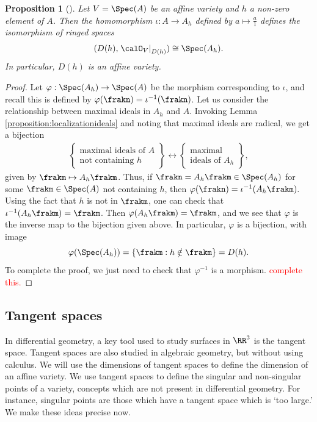 \documentclass[12pt]{amsart}
\theoremstyle{plain}
\newtheorem{proposition}[theorem]{Proposition}
\theoremstyle{definition}
\begin{document}
\begin{proposition}[{\cite[Proposition 3.32]{Milne13}}]\label{proposition:localisationembedding}
Let $V = \Spec(A)$ be an affine variety and $h$ a non-zero element of $A$.
Then the homomorphism $\iota : A \to A_h$ defined by $a \mapsto \frac{a}{1}$ defines the isomorphism of ringed spaces
$$(D(h), \left. \calO_V \right|_{D(h)}) \cong \Spec(A_h).$$
In particular, $D(h)$ is an affine variety.
\end{proposition}
\begin{proof}
Let $\varphi : \Spec(A_h) \to \Spec(A)$ be the morphism corresponding to $\iota$, and recall this is defined by $\varphi(\frakn) = \iota^{-1}(\frakn)$.
Let us consider the relationship between maximal ideals in $A_h$ and $A$.
Invoking Lemma \ref{proposition:localizationideals} and noting that maximal ideals are radical, we get a bijection
\begin{align*}
\left\{
\begin{array}{c}
	\text{maximal ideals of } A \\
	\text{not containing } h
\end{array}
\right\} \longleftrightarrow 
\left\{
\begin{array}{c}
	\text{maximal} \\
	\text{ideals of } A_h 
\end{array}
\right\},
\end{align*}
given by $\frakm \mapsto A_h \frakm$.
Thus, if $\frakn = A_h \frakm \in \Spec(A_h)$ for some $\frakm \in \Spec(A)$ not containing $h$, then $\varphi(\frakn) = \iota^{-1}(A_h \frakm).$
Using the fact that $h$ is not in $\frakm$, one can check that $\iota^{-1}(A_h \frakm) = \frakm$.
Then $\varphi(A_h \frakm) = \frakm$, and we see that $\varphi$ is the inverse map to the bijection given above.
In particular, $\varphi$ is a bijection, with image
$$\varphi(\Spec(A_h)) = \{\frakm : h \notin \frakm\} = D(h).$$
To complete the proof, we just need to check that $\varphi^{-1}$ is a morphism.
\textcolor{red}{complete this.}
\end{proof}





\subsection{Tangent spaces}
In differential geometry, a key tool used to study surfaces in $\RR^3$ is the tangent space.
Tangent spaces are also studied in algebraic geometry, but without using calculus.
We will use the dimensions of tangent spaces to define the dimension of an affine variety.
We use tangent spaces to define the singular and non-singular points of a variety, concepts which are not present in differential geometry.
For instance, singular points are those which have a tangent space which is `too large.'
We make these ideas precise now.
\end{document}

